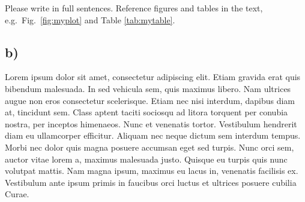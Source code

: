 \documentclass[a4paper,11pt]{article}
\begin{document}
Please write in full sentences. Reference figures and tables in the text, e.g.~Fig.~\ref{fig:myplot} and Table \ref{tab:mytable}.

\subsection*{b)}
Lorem ipsum dolor sit amet, consectetur adipiscing elit. Etiam gravida erat quis bibendum malesuada. In sed vehicula sem, quis maximus libero. Nam ultrices augue non eros consectetur scelerisque. Etiam nec nisi interdum, dapibus diam at, tincidunt sem. Class aptent taciti sociosqu ad litora torquent per conubia nostra, per inceptos himenaeos. Nunc et venenatis tortor. Vestibulum hendrerit diam eu ullamcorper efficitur. Aliquam nec neque dictum sem interdum tempus. Morbi nec dolor quis magna posuere accumsan eget sed turpis. Nunc orci sem, auctor vitae lorem a, maximus malesuada justo. Quisque eu turpis quis nunc volutpat mattis. Nam magna ipsum, maximus eu lacus in, venenatis facilisis ex. Vestibulum ante ipsum primis in faucibus orci luctus et ultrices posuere cubilia Curae.
\end{document}
